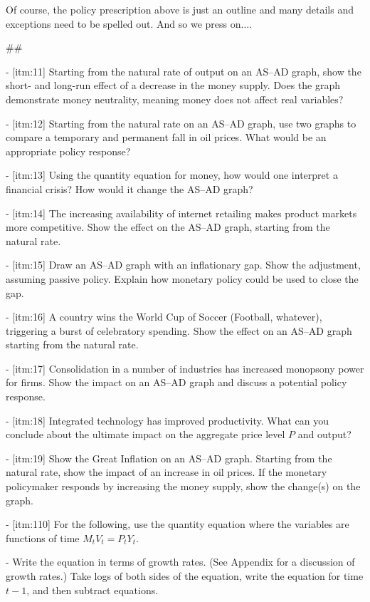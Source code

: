 ﻿\documentclass[oneside]{book}
\begin{document}
Of course, the policy prescription above is just an outline and many details and exceptions need to be spelled out. And so we press on....



##




- [itm:11] Starting from the natural rate of output on an AS--AD graph, show the short- and long-run effect of a decrease in the money supply. Does the graph demonstrate money neutrality, meaning money does not affect real variables?

- [itm:12] Starting from the natural rate on an AS--AD graph, use two graphs to compare a temporary and permanent fall in oil prices. What would be an
appropriate policy response?

- [itm:13] Using the quantity equation for money, how would one interpret a financial crisis? How would it change the AS--AD graph?

- [itm:14] The increasing availability of internet retailing makes product markets more competitive. Show the effect on the AS--AD graph, starting from the natural rate.

- [itm:15] Draw an AS--AD graph with an inflationary gap. Show the adjustment, assuming passive policy. Explain how monetary policy could be used to close the gap.

- [itm:16] A country wins the World Cup of Soccer (Football, whatever), triggering a burst of celebratory spending. Show the effect on an AS--AD graph starting from the natural rate.

- [itm:17] Consolidation in a number of industries has increased monopsony power for firms. Show the impact on an AS--AD graph and discuss a potential policy response.

- [itm:18] Integrated technology has improved productivity. What can you conclude about the ultimate impact on the aggregate price level $P$ and
output?

- [itm:19] Show the Great Inflation on an AS--AD graph. Starting from the natural rate, show the impact of an increase in oil prices. If the
monetary policymaker responds by increasing the money supply, show the
change(s) on the graph.

- [itm:110] For the following, use the quantity equation where the variables are functions of time $M_{t}V_{t}=P_{t}Y_{t}$.


- Write the equation in terms of growth rates. (See Appendix  for a discussion of growth rates.) Take logs of both sides of the equation, write the equation for time $t-1$, and then subtract equations.
\end{document}
